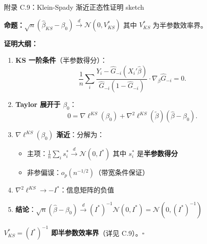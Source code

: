 \documentclass[aspectratio=169, 10pt]{beamer}
\begin{document}
\begin{frame}{附录 C.9：Klein-Spady 渐近正态性证明 sketch}
  \hypertarget{proof-c9}{}

  \textbf{命题：}$\sqrt{n}(\hat\beta_{KS} - \beta_0) \overset{d}{\to} \mathcal{N}(0, V^{*}_{KS})$
  其中 $V^{*}_{KS}$ 为半参数效率界。

  \textbf{证明大纲：}
  \begin{enumerate}\setlength{\itemsep}{1pt}
    \item \textbf{KS 一阶条件}（半参数得分）：
    $$\frac{1}{n}\sum_i \frac{Y_i - \hat G_{-i}(X_i'\hat\beta)}{\hat G_{-i}(1 - \hat G_{-i})}
    \cdot \nabla_\beta \hat G_{-i} = 0.$$

    \item \textbf{Taylor 展开于 $\beta_0$}：
    $$0 = \nabla \ell^{KS}(\beta_0) + \nabla^2 \ell^{KS}(\tilde\beta)(\hat\beta - \beta_0).$$

    \item \textbf{$\nabla \ell^{KS}(\beta_0)$ 渐近}：分解为：
    \begin{itemize}\setlength{\itemsep}{1pt}
      \item 主项：$\frac{1}{n}\sum_i s^{*}_i \overset{d}{\to} \mathcal{N}(0, I^{*})$
      其中 $s^{*}_i$ 是\textbf{半参数得分}
      \item 非参偏误：$o_p(n^{-1/2})$（带宽条件保证）
    \end{itemize}

    \item \textbf{$\nabla^2 \ell^{KS} \to -I^{*}$}：信息矩阵的负值

    \item \textbf{结论}：$\sqrt{n}(\hat\beta - \beta_0) \overset{d}{\to} (I^{*})^{-1} \mathcal{N}(0, I^{*}) = \mathcal{N}(0, (I^{*})^{-1})$
  \end{enumerate}

  \textbf{$V^{*}_{KS} = (I^{*})^{-1}$ 即半参数效率界}（详见 C.9）。$\square$
  \hfill{\scriptsize\hyperlink{main-c9}{}}

\end{frame}
\end{document}
